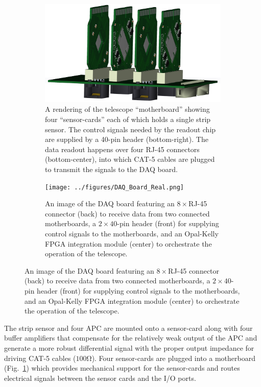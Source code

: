 \documentclass{PoS}
\begin{document}
\begin{figure}[h]
  \centering
  \begin{subfigure}[t]{0.45\textwidth}
    \includegraphics[width=\textwidth]{../figures/Half-Telescope-Full.png}
    \caption{A rendering of the telescope ``motherboard'' showing four
      ``sensor-cards'' each of which holds a single strip sensor. The control
      signals needed by the readout chip are supplied by a 40-pin header
      (bottom-right). The data readout happens over four RJ-45 connectors (bottom-center), into
      which CAT-5 cables are plugged to transmit the signals to the DAQ board.}
\label{fig:hardware:motherboard}
  \end{subfigure}
  \hspace{.3in}
  \begin{subfigure}[t]{0.45\textwidth}
    \texttt{[image: ../figures/DAQ\_Board\_Real.png]}
    \caption{An image of the DAQ board featuring an $8\times$RJ-45
      connector (back) to receive data from two connected motherboards, a
      $2\times40$-pin header (front) for supplying control signals to the
      motherboards, and an Opal-Kelly FPGA integration module (center) to
      orchestrate the operation of the telescope.}
\label{fig:hardware:daq}
  \end{subfigure}
\label{fig:hardware}
\end{figure}

The strip sensor and four APC are mounted onto a sensor-card along
with four buffer amplifiers that compensate for the relatively weak output of
the APC and generate a more robust differential signal with the proper output
impedance for driving CAT-5 cables ($100\si{\ohm}$). Four sensor-cards are
plugged into a motherboard (Fig.~\ref{fig:hardware:motherboard}) which provides mechanical support for the
sensor-cards and routes electrical signals between the sensor cards and the I/O
ports.
\end{document}
